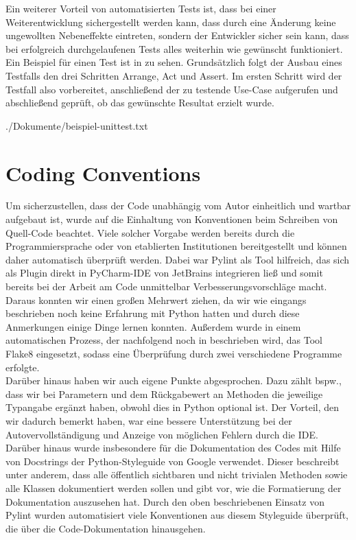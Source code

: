 Ein weiterer Vorteil von automatisierten Tests ist, dass bei einer Weiterentwicklung sichergestellt werden kann, dass
durch eine Änderung keine ungewollten Nebeneffekte eintreten, sondern der Entwickler sicher sein kann, dass bei
erfolgreich durchgelaufenen Tests alles weiterhin wie gewünscht funktioniert. \\

Ein Beispiel für einen Test ist in  zu sehen.
Grundsätzlich folgt der Ausbau eines Testfalls den drei Schritten Arrange, Act und Assert.
Im ersten Schritt wird der Testfall also vorbereitet, anschließend der zu testende Use-Case aufgerufen und abschließend
geprüft, ob das gewünschte Resultat erzielt wurde. 


{./Dokumente/beispiel-unittest.txt}

\section{Coding Conventions}
\label{sec:code-conventions}

Um sicherzustellen, dass der Code unabhängig vom Autor einheitlich und wartbar aufgebaut ist, wurde auf die Einhaltung
von Konventionen beim Schreiben von Quell-Code beachtet. 
Viele solcher Vorgabe werden bereits durch die Programmiersprache oder von etablierten Institutionen bereitgestellt und
können daher automatisch überprüft werden. 
Dabei war Pylint  als Tool hilfreich, das sich als Plugin direkt in PyCharm-IDE von JetBrains 
integrieren ließ und somit bereits bei der Arbeit am Code unmittelbar Verbesserungsvorschläge macht.
Daraus konnten wir einen großen Mehrwert ziehen, da wir wie eingangs beschrieben noch keine Erfahrung mit Python hatten
und durch diese Anmerkungen einige Dinge lernen konnten.
Außerdem wurde in einem automatischen Prozess, der nachfolgend noch in  beschrieben wird,
das Tool Flake8  eingesetzt, sodass eine Überprüfung durch zwei verschiedene Programme erfolgte. \\

Darüber hinaus haben wir auch eigene Punkte abgesprochen.
Dazu zählt bspw., dass wir bei Parametern und dem Rückgabewert an Methoden die jeweilige Typangabe ergänzt haben, obwohl
dies in Python optional ist.
Der Vorteil, den wir dadurch bemerkt haben, war eine bessere Unterstützung bei der Autovervollständigung und Anzeige
von möglichen Fehlern durch die IDE\@.
Darüber hinaus wurde insbesondere für die Dokumentation des Codes mit Hilfe von Docstrings der Python-Styleguide von
Google  verwendet.
Dieser beschreibt unter anderem, dass alle öffentlich sichtbaren und nicht trivialen Methoden sowie alle Klassen
dokumentiert werden sollen und gibt vor, wie die Formatierung der Dokumentation auszusehen hat.
Durch den oben beschriebenen Einsatz von Pylint wurden automatisiert viele Konventionen aus diesem Styleguide überprüft,
die über die Code-Dokumentation hinausgehen.
